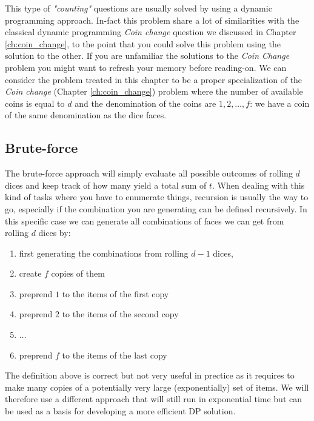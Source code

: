 This type of \textit{"counting"} questions are usually solved by using a dynamic programming
approach. In-fact this problem share a lot of similarities with the classical dynamic programming
\textit{Coin change} question we discussed in Chapter \ref{ch:coin_change}, to the point that you
could solve this problem using the solution to the other. If you are unfamiliar the solutions to the
\textit{Coin Change} problem you might want to refresh your memory before reading-on. We can
consider the problem treated in this chapter to be a proper specialization of the \textit{Coin
change} (Chapter \ref{ch:coin_change}) problem where the number of available coins is equal to $d$
and the denomination of the coins are $1,2,\ldots,f$: we have a coin of the same denomination as the
dice faces.


\subsection{Brute-force}
\label{dice_rolls:sec:bruteforce}
The brute-force approach will simply evaluate all possible outcomes of rolling $d$ dices and keep
track of how many yield a total sum of $t$. When dealing with this kind of tasks where you have to
enumerate things, recursion is usually the way to go, especially if the combination you are
generating can be defined recursively. In this specific case we can generate all combinations of
faces we can get from rolling $d$ dices by:
\begin{enumerate}
	\item first generating the combinations from rolling $d-1$ dices,
	\item create $f$ copies of them
	\item preprend $1$ to the items of the first copy
	\item preprend $2$ to the items of the second copy
	\item $\ldots$
	\item preprend $f$ to the items of the last copy
\end{enumerate}
The definition above is correct but not very useful in prectice as it requires to make many copies
of a potentially very large (exponentially) set of items. We will therefore use a different approach
that will still run in exponential time but can be used as a basis for developing a more efficient
DP solution.

